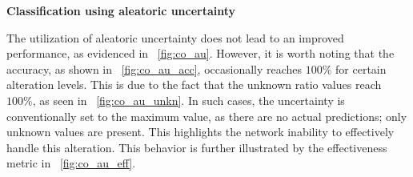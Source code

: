 \vspace{0.3cm}
\textbf{Classification using aleatoric uncertainty}
\vspace{0.1cm}

The utilization of aleatoric uncertainty does not lead to an improved performance, as evidenced in \Fig~\ref{fig:co_au}. However, it is worth noting that the accuracy, as shown in \Fig~\ref{fig:co_au_acc}, occasionally reaches $100\%$ for certain alteration levels. This is due to the fact that the unknown ratio values reach $100\%$, as seen in \Fig~\ref{fig:co_au_unkn}. In such cases, the uncertainty is conventionally set to the maximum value, as there are no actual predictions; only unknown values are present. This highlights the network inability to effectively handle this alteration. This behavior is further illustrated by the effectiveness metric in \Fig~\ref{fig:co_au_eff}.
